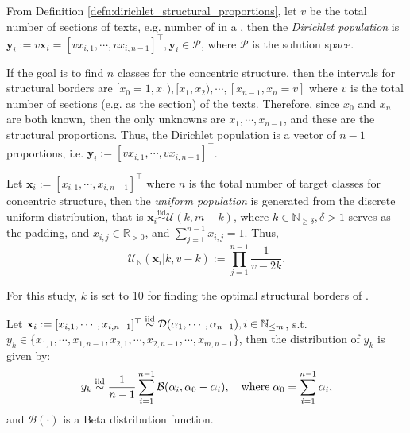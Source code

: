 \begin{defn}\label{defn:dirichlet_population}
    From Definition \ref{defn:dirichlet_structural_proportions}, let $v$ be the total number of sections of texts, e.g. number of   in a  , then the \textit{Dirichlet population} is $\mathbf{y}_i:=v\mathbf{x}_i=[vx_{i,1},\cdots,vx_{i,n-1}]^{\top},\mathbf{y}_i\in\mathscr{P}$, where $\mathscr{P}$ is the solution space.
\end{defn}
\begin{remark}
    If the goal is to find $n$ classes for the concentric structure, then the intervals for structural borders are $[x_0=1,x_1),[x_1,x_2),\cdots,[x_{n-1},x_n=v]$ where $v$ is the total number of sections (e.g.  \textnormal{} as the section) of the texts. Therefore, since $x_0$ and $x_n$ are both known, then the only unknowns are $x_1,\cdots,x_{n-1}$, and these are the structural proportions. Thus, the Dirichlet population is a vector of $n-1$ proportions, i.e. $\mathbf{y}_i:=[vx_{i,1},\cdots,vx_{i,n-1}]^{\top}$.
\end{remark}
\begin{defn}\label{defn:discrete_uniform_population}
    Let $\mathbf{x}_i:=[x_{i,1},\cdots,x_{i,n-1}]^{\top}$ where $n$ is the total number of target classes for concentric structure, then the \textit{uniform population} is generated from the discrete uniform distribution, that is $\mathbf{x}_i\overset{\text{iid}}{\sim}\mathcal{U}(k,m-k)$, where $k\in\mathbb{N}_{\geq \delta},\delta>1$ serves as the padding, and $x_{i,j}\in\mathbb{R}_{>0}$, and $\sum_{j=1}^{n-1}x_{i,j}=1$. Thus,
    \begin{equation}
        \mathcal{U}_{\mathbb{N}}(\mathbf{x}_i|k,v-k):=\prod_{j=1}^{n-1}\frac{1}{v-2k}.
    \end{equation}
\end{defn}
\begin{remark}
    For this study, $k$ is set to 10 for finding the optimal structural borders of  \textnormal{}.
\end{remark}
\begin{prop}\label{prop:mixture_beta}
    Let $\mathbf{x}_i:=[x_{i,1},\cdots,x_{i,n-1}]^{\top}\overset{\textnormal{iid}}{\sim}\mathcal{D}(\alpha_1,\cdots,\alpha_{n-1}),i\in\mathbb{N}_{\leq m}$, s.t. $y_k\in\{x_{1,1},\cdots,x_{1,n-1},x_{2,1},\cdots,x_{2,n-1},\cdots,x_{m,n-1}\}$, then the distribution of $y_k$ is given by:
\begin{equation}
y_k\overset{\textnormal{iid}}{\sim}\frac{1}{n-1}\sum_{i=1}^{n-1}\mathcal{B}(\alpha_i,\alpha_0-\alpha_i),\quad\text{where}\;\alpha_0=\sum_{i=1}^{n-1}\alpha_i,
\end{equation}
and $\mathcal{B}(\cdot)$ is a Beta distribution function.
\end{prop}
